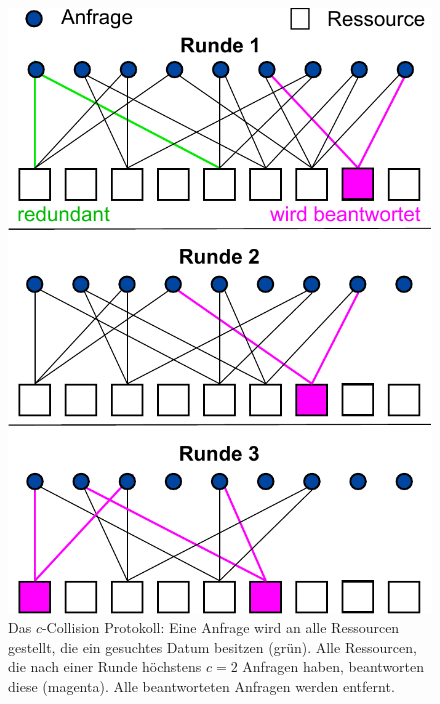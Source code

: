 \begin{figure}
  \centering
  \includegraphics[scale=0.55]{images/ccollision2.pdf}
  \caption[Das $c$-Collision Protokoll]{\label{fig:relwork:ccollision} Das $c$-Collision Protokoll: Eine Anfrage wird an alle Ressourcen gestellt, die ein gesuchtes Datum besitzen (grün). Alle Ressourcen, die nach einer Runde höchstens $c=2$ Anfragen haben, beantworten diese (magenta). Alle beantworteten Anfragen werden entfernt.}\phantom{\;\;\;\;\;\;\;\;\;\;\;\;\;\;\;\;\;\;\;\;\;\;}
\end{figure}

